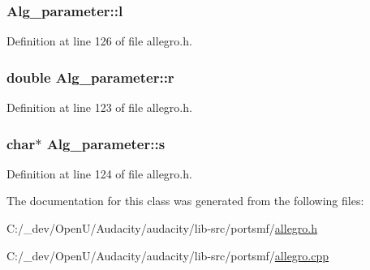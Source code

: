 \subsubsection[{\texorpdfstring{l}{l}}]{ Alg\+\_\+parameter\+::l}\hypertarget{class_alg__parameter_a47c6458d207bb11fa642048af27e74f8}{}\label{class_alg__parameter_a47c6458d207bb11fa642048af27e74f8}


Definition at line 126 of file allegro.\+h.

\subsubsection[{\texorpdfstring{r}{r}}]{\setlength{\rightskip}{0pt plus 5cm}double Alg\+\_\+parameter\+::r}\hypertarget{class_alg__parameter_a80d97feaf7a02d9add1324fa5560b8b9}{}\label{class_alg__parameter_a80d97feaf7a02d9add1324fa5560b8b9}


Definition at line 123 of file allegro.\+h.

\subsubsection[{\texorpdfstring{s}{s}}]{ char$\ast$ Alg\+\_\+parameter\+::s}\hypertarget{class_alg__parameter_afb0681fe58bf541fbdea91dd43432e7c}{}\label{class_alg__parameter_afb0681fe58bf541fbdea91dd43432e7c}


Definition at line 124 of file allegro.\+h.



The documentation for this class was generated from the following files\+:\begin{DoxyCompactItemize}
\item 
C\+:/\+\_\+dev/\+Open\+U/\+Audacity/audacity/lib-\/src/portsmf/\hyperlink{allegro_8h}{allegro.\+h}\item 
C\+:/\+\_\+dev/\+Open\+U/\+Audacity/audacity/lib-\/src/portsmf/\hyperlink{allegro_8cpp}{allegro.\+cpp}\end{DoxyCompactItemize}
